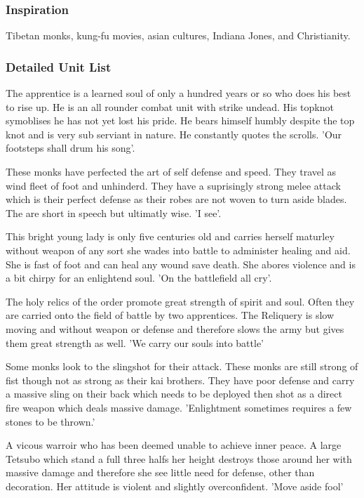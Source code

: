 \documentclass[a4paper]{article}
\begin{document}
\subsubsection{Inspiration}
Tibetan monks, kung-fu movies, asian cultures, Indiana Jones, and Christianity.

\subsubsection{Detailed Unit List}

The apprentice is a learned soul of only a hundred years or so who does his best to rise up. He is an all rounder combat unit with strike undead. His topknot symoblises he has not yet lost his pride. He bears himself humbly despite the top knot and is very sub serviant in nature. He constantly quotes the scrolls. 'Our footsteps shall drum his song'.

These monks have perfected the art of self defense and speed. They travel as wind fleet of foot and unhinderd. They have a suprisingly strong melee attack which is their perfect defense as their robes are not woven to turn aside blades. The are short in speech but ultimatly wise.  'I see'.

This bright young lady is only five centuries old and carries herself maturley without weapon of any sort she wades into battle to administer healing and aid. She is fast of foot and can heal any wound save death. She abores violence and is a bit chirpy for an enlightend soul. 'On the battlefield all cry'.

The holy relics of the order promote great strength of spirit and soul. Often they are carried onto the field of battle by two apprentices. The Reliquery is slow moving and without weapon or defense and therefore slows the army but gives them great strength as well. 'We carry our souls into battle'

Some monks look to the slingshot for their attack. These monks are still strong of fist though not as strong as their kai brothers. They have poor defense and carry a massive sling on their back which needs to be deployed then shot as a direct fire weapon which deals massive damage. 'Enlightment sometimes requires a few stones to be thrown.'

A vicous warroir who has been deemed unable to achieve inner peace. A large Tetsubo which stand a full three halfs her height destroys those around her with massive damage and therefore she see little need for defense, other than decoration. Her attitude is violent and slightly overconfident. 'Move aside fool'
\end{document}
